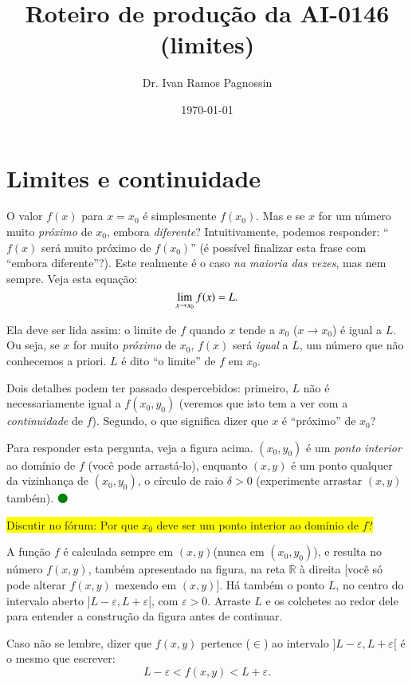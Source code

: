 \documentclass[fleqn,12pt]{article}
\title{Roteiro de produção da AI-0146 (limites)}
\author{Dr. Ivan Ramos Pagnossin}
\date{\today}
\newcommand\proceed{\textcolor{green}{$\medbullet$}\xspace}
\newcommand\pt{\ensuremath{(x,y)}\xspace}
\newcommand\ptzero{\ensuremath{(x_0,y_0)}\xspace}
\newcommand\forum[1]{\colorbox{yellow}{Discutir no fórum: #1}}
\begin{document}
    \maketitle
    


    \section{Limites e continuidade}

    O valor $f(x)$ para $x = x_0$ é simplesmente $f(x_0)$. Mas e se $x$ for um número muito \emph{próximo} de $x_0$, embora \emph{diferente}? Intuitivamente, podemos responder: ``$f(x)$ será muito próximo de $f(x_0)$'' (é possível finalizar esta frase com ``embora diferente''?). Este realmente é o caso \emph{na maioria das vezes}, mas nem sempre. Veja esta equação:
    \begin{equation*}
	\lim_{\scriptsize x  \to x_0} f(x) = L.
    \end{equation*}

    Ela deve ser lida assim: o limite de $f$ quando $x$ tende a $x_0$ ($x \to x_0$) é igual a $L$. Ou seja, se $x$ for muito \emph{próximo} de $x_0$, $f(x)$ será \emph{igual} a $L$, um número que não conhecemos a priori. $L$ é dito ``o limite'' de $f$ em $x_0$.

    Dois detalhes podem ter passado despercebidos: primeiro, $L$ não é necessariamente igual a $f(x_0,y_0)$ (veremos que isto tem a ver com a \emph{continuidade} de $f$). Segundo, o que significa dizer que $x$ é ``próximo'' de $x_0$?

    Para responder esta pergunta, veja a figura acima. \ptzero é um \emph{ponto interior} ao domínio de $f$ (você pode arrastá-lo), enquanto \pt é um ponto qualquer da vizinhança de \ptzero, o círculo de raio $\delta > 0$ (experimente arrastar \pt também). \proceed

    \forum{Por que $x_0$ deve ser um ponto interior ao domínio de $f$?}

    A função $f$ é calculada sempre em \pt (nunca em \ptzero), e resulta no número $f(x,y)$, também apresentado na figura, na reta $\mathbb{R}$ à direita [você só pode alterar $f(x,y)$ mexendo em \pt]. Há também o ponto $L$, no centro do intervalo aberto $]L - \varepsilon, L + \varepsilon[$, com $\varepsilon > 0$. Arraste $L$ e os colchetes ao redor dele para entender a construção da figura antes de continuar. 

    Caso não se lembre, dizer que $f(x,y)$ pertence ($\in$) ao intervalo $]L - \varepsilon, L + \varepsilon[$ é o mesmo que escrever:
    \begin{equation*}
	L - \varepsilon < f(x,y) < L + \varepsilon.
    \end{equation*}
\end{document}
